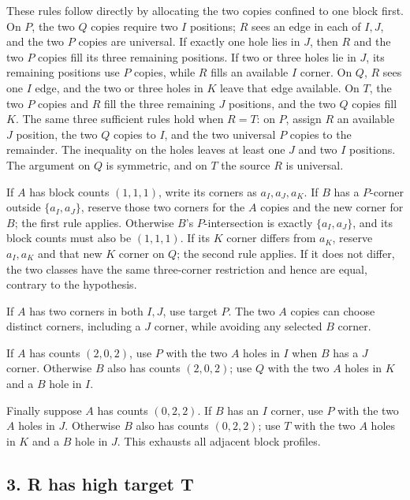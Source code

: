 \documentclass[
  10pt,
]{article}
\begin{document}
These rules follow directly by allocating the two copies confined to one
block first. On \(P\), the two \(Q\) copies require two \(I\) positions;
\(R\) sees an edge in each of \(I,J\), and the two \(P\) copies are
universal. If exactly one hole lies in \(J\), then \(R\) and the two
\(P\) copies fill its three remaining positions. If two or three holes
lie in \(J\), its remaining positions use \(P\) copies, while \(R\)
fills an available \(I\) corner. On \(Q\), \(R\) sees one \(I\) edge,
and the two or three holes in \(K\) leave that edge available. On \(T\),
the two \(P\) copies and \(R\) fill the three remaining \(J\) positions,
and the two \(Q\) copies fill \(K\). The same three sufficient rules
hold when \(R=T\): on \(P\), assign \(R\) an available \(J\) position,
the two \(Q\) copies to \(I\), and the two universal \(P\) copies to the
remainder. The inequality on the holes leaves at least one \(J\) and two
\(I\) positions. The argument on \(Q\) is symmetric, and on \(T\) the
source \(R\) is universal.

If \(A\) has block counts \((1,1,1)\), write its corners as
\(a_I,a_J,a_K\). If \(B\) has a \(P\)-corner outside \(\{a_I,a_J\}\),
reserve those two corners for the \(A\) copies and the new corner for
\(B\); the first rule applies. Otherwise \(B\)'s \(P\)-intersection is
exactly \(\{a_I,a_J\}\), and its block counts must also be \((1,1,1)\).
If its \(K\) corner differs from \(a_K\), reserve \(a_I,a_K\) and that
new \(K\) corner on \(Q\); the second rule applies. If it does not
differ, the two classes have the same three-corner restriction and hence
are equal, contrary to the hypothesis.

If \(A\) has two corners in both \(I,J\), use target \(P\). The two
\(A\) copies can choose distinct corners, including a \(J\) corner,
while avoiding any selected \(B\) corner.

If \(A\) has counts \((2,0,2)\), use \(P\) with the two \(A\) holes in
\(I\) when \(B\) has a \(J\) corner. Otherwise \(B\) also has counts
\((2,0,2)\); use \(Q\) with the two \(A\) holes in \(K\) and a \(B\)
hole in \(I\).

Finally suppose \(A\) has counts \((0,2,2)\). If \(B\) has an \(I\)
corner, use \(P\) with the two \(A\) holes in \(J\). Otherwise \(B\)
also has counts \((0,2,2)\); use \(T\) with the two \(A\) holes in \(K\)
and a \(B\) hole in \(J\). This exhausts all adjacent block profiles.

\hypertarget{r-has-high-target-t}{%
\subsection*{3. R has high target T}\label{r-has-high-target-t}}
\end{document}

